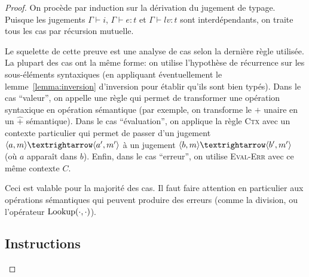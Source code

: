 \begin{proof}

On procède par induction sur la dérivation du jugement de typage. Puisque les
jugements $Γ ⊢ i$, $Γ ⊢ e : t$ et $Γ ⊢ lv : t$ sont interdépendants, on traite
tous les cas par récursion mutuelle.

Le squelette de cette preuve est une analyse de cas selon la dernière règle
utilisée. La plupart des cas ont la même forme: on utilise l'hypothèse de
récurrence sur les sous-éléments syntaxiques (en appliquant éventuellement le
lemme~\ref{lemma:inversion} d'inversion pour établir qu'ils sont bien typés).
Dans le cas \enquote{valeur}, on appelle une règle qui permet de transformer une
opération syntaxique en opération sémantique (par exemple, on transforme le $+$
unaire en un $\widehat{+}$ sémantique). Dans le cas \enquote{évaluation}, on
applique la règle \textsc{Ctx} avec un contexte particulier qui permet de passer
d'un jugement $\mm{m}{a}{m'}{a'}$ à un jugement $\mm{m}{b}{m'}{b'}$ (où $a$
apparaît dans $b$). Enfin, dans le cas \enquote{erreur}, on utilise
\textsc{Eval-Err} avec ce même contexte $C$.

Ceci est valable pour la majorité des cas. Il faut faire attention en
particulier aux opérations sémantiques qui peuvent produire des erreurs (comme
la division, ou l'opérateur $\mathrm{Lookup} (\cdot, \cdot)$).




\subsection*{Instructions}


\end{proof}

